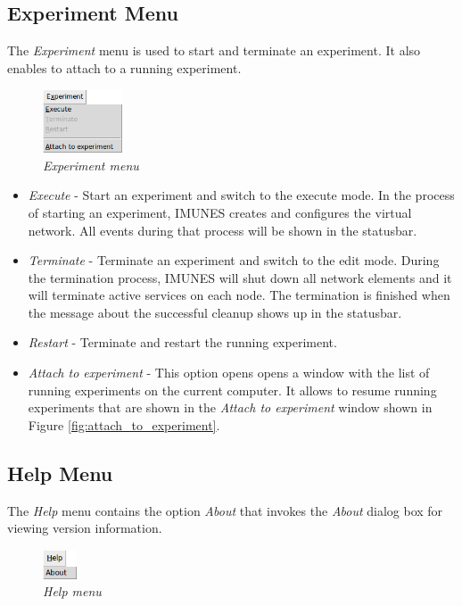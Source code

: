   \subsection{Experiment Menu}
  The \emph{Experiment} menu is used to start and terminate an experiment. It
  also enables to attach to a running experiment.
  
  \begin{figure}[H]
  \centering
  \vspace{10pt}
  \includegraphics[width=0.21\textwidth]{./images/experiment_menu.png}
  \caption{\emph{Experiment menu}}
  \label{fig:experiment_menu}
  \end{figure}
  
  \begin{itemize}
  \item \emph{Execute} - Start an experiment and switch to the execute mode. In
the process of starting an experiment, IMUNES creates and configures the
virtual network. All events during that process will be shown in the statusbar.
  \item \emph{Terminate} - Terminate an experiment and switch to the edit mode.
During the termination process, IMUNES will shut down all network elements and
it will terminate active services on each node. The termination is finished
when the message about the successful cleanup shows up in the statusbar.
  \item \emph{Restart} - Terminate and restart the running experiment.
  \item \emph{Attach to experiment} - This option opens opens a window with the
list of running experiments on the current computer. It allows to resume
running experiments that are shown in the \emph{Attach to experiment} window
shown in Figure \ref{fig:attach_to_experiment}.
  \end{itemize}
  
  \subsection{Help Menu}
  The \emph{Help} menu contains the option \emph{About} that invokes the
\emph{About} dialog box for viewing version information.
  
  \begin{figure}[H]
  \centering
  \vspace{10pt}
  \includegraphics[width=0.09\textwidth]{./images/help_menu.png}
  \caption{\emph{Help menu}}
  \label{fig:help_menu} \end{figure}
   
